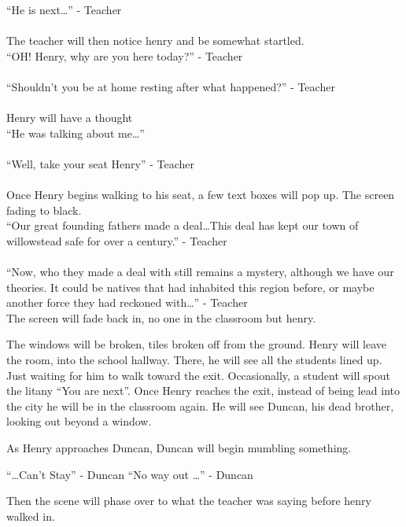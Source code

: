 \documentclass[12pt, a4paper, titlepage]{article}
\begin{document}
            ``He is next\ldots'' - Teacher\\~\\
            The teacher will then notice henry and be somewhat startled.\\
            ``OH! Henry, why are you here today?'' - Teacher\\~\\
            ``Shouldn't you be at home resting after what happened?'' - Teacher\\~\\
            Henry will have a thought\\
            ``He was talking about me\ldots''\\~\\
            ``Well, take your seat Henry'' - Teacher\\~\\
            Once Henry begins walking to his seat, a few text boxes will pop up. The screen fading to black.\\
            ``Our great founding fathers made a deal\ldots This deal has kept our town of willowstead safe for over a century.'' - Teacher\\~\\
            
            ``Now, who they made a deal with still remains a mystery, although we have our theories. It could be natives that had inhabited this region before, or maybe another force they had reckoned with\ldots'' - Teacher\\
            
            The screen will fade back in, no one in the classroom but henry. 
            
            The windows will be broken, tiles broken off from the ground. Henry will leave the room, into the school hallway. There, he will see all the students lined up. Just
            waiting for him to walk toward the exit. Occasionally, a student will spout the litany ``You are next''. Once Henry reaches the exit, instead of being lead into the city
            he will be in the classroom again. He will see Duncan, his dead brother, looking out beyond a window.
            
            As Henry approaches Duncan, Duncan will begin mumbling something.
            
            ``\ldots Can't Stay''  - Duncan
            ``No way out \ldots'' - Duncan
            
            Then the scene will phase over to what the teacher was saying before henry walked in.\\
            
\end{document}
